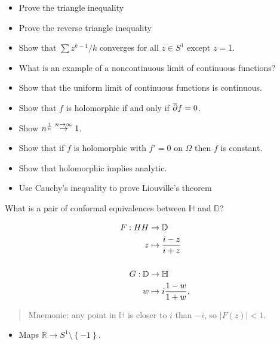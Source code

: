 \begin{itemize}
\tightlist
\item
  Prove the triangle inequality
\item
  Prove the reverse triangle inequality
\item
  Show that \(\sum z^{k-1}/k\) converges for all \(z\in S^1\) except
  \(z=1\).
\item
  What is an example of a noncontinuous limit of continuous functions?
\item
  Show that the uniform limit of continuous functions is continuous.
\item
  Show that \(f\) is holomorphic if and only if
  \(\mkern 1.5mu\overline{\mkern-1.5mu{\partial}\mkern-1.5mu}\mkern 1.5muf = 0\).
\item
  Show \(n^{1\over n} \overset{n\to \infty } \to 1\).
\item
  Show that if \(f\) is holomorphic with \(f'=0\) on \(\Omega\) then
  \(f\) is constant.
\item
  Show that holomorphic implies analytic.
\item
  Use Cauchy's inequality to prove Liouville's theorem
\end{itemize}

\begin{problem}[?]

What is a pair of conformal equivalences between \({\mathbb{H}}\) and
\({\mathbb{D}}\)?

\begin{solution}

\begin{align*}
F: HH &\to {\mathbb{D}}\\
z & \mapsto {i-z \over i+z}
\\
\\
G: {\mathbb{D}}&\to {\mathbb{H}}\\
w &\mapsto i{1-w \over 1 + w}
.\end{align*}

\begin{quote}
Mnemonic: any point in \({\mathbb{H}}\) is closer to \(i\) than \(-i\),
so \({\left\lvert {F(z)} \right\rvert} < 1\).
\end{quote}

\begin{itemize}
\tightlist
\item
  Maps \({\mathbb{R}}\to S^1\setminus\left\{{-1}\right\}\).
\end{itemize}

\end{solution}

\end{problem}

